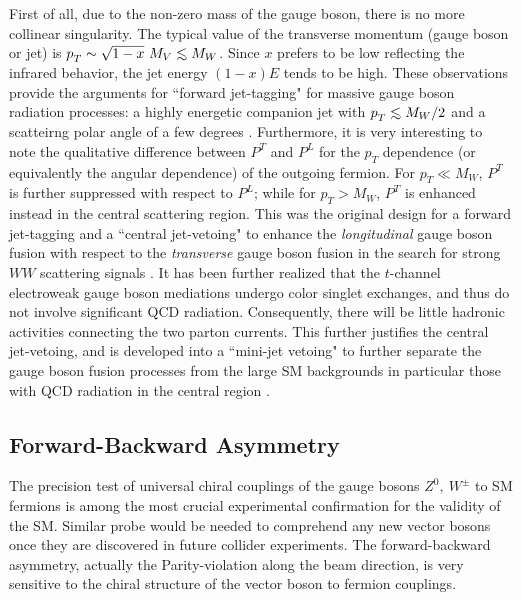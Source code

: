 \documentclass[12pt,prd,aps,floats,preprintnumbers,preprint,superscriptaddress,floatfix,nofootinbib]{revtex4}
\def\lsim{\mathrel{\raise.3ex\hbox{$<$\kern-.75em\lower1ex\hbox{$\sim$}}}}
\def\pt{p_T^{}}
\begin{document}
First of all, 
due to the non-zero mass of the gauge boson, there is no more collinear
singularity. The typical value of the transverse momentum 
 (gauge boson or jet)  is $\pt \sim \sqrt{1-x}\ M_V \lsim M_W$. 
Since $x$ prefers to be low reflecting the infrared behavior, 
the jet energy $(1-x)E$ tends to be high.
These observations provide the arguments for ``forward jet-tagging" 
for massive gauge boson radiation processes: a highly energetic 
companion  jet with $\pt \lsim M_W/2$ and a scatteirng polar angle of a few 
degrees \cite{jettag}.  Furthermore, it  is very interesting to note 
the qualitative difference between  $P^T$ and $P^L$ for the $\pt$ dependence
(or equivalently the angular dependence) of the outgoing fermion.
For $\pt \ll M_W$, $P^T$ is further suppressed with respect to $P^L$;
while for $\pt > M_W$, $P^T$ is enhanced instead in the central scattering
region. This was the
original design for a forward jet-tagging and a 
``central jet-vetoing"  \cite{tagveto} to enhance the 
{\it longitudinal} gauge boson
fusion with respect to the {\it transverse} gauge boson fusion in the search
for strong $WW$ scattering signals \cite{baggeretal}. 
It has been further realized that the $t$-channel electroweak 
gauge boson  mediations
undergo color singlet exchanges, and thus do not involve significant QCD 
radiation. Consequently, there will be little hadronic activities connecting
the two parton currents. This further justifies the central jet-vetoing, and 
is developed into a ``mini-jet vetoing" to further
separate the gauge boson fusion processes from the large SM backgrounds
in particular those with QCD radiation in the central region \cite{dieter}.


\subsection{Forward-Backward Asymmetry}
The precision test  of universal chiral couplings of 
the gauge bosons  $Z^0,\ W^\pm$ to SM fermions is among the most
 crucial experimental confirmation for the validity of the SM.
Similar probe would be needed to comprehend any new vector bosons 
once they are discovered in future collider experiments.
The forward-backward asymmetry, actually the Parity-violation along the
beam direction, is very sensitive to the chiral structure of the vector boson 
to fermion couplings. 
\end{document}
